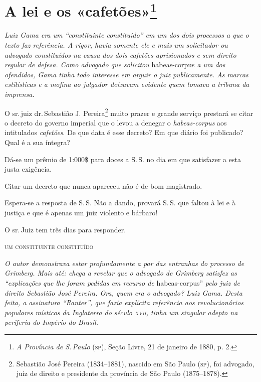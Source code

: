 \chapter{A lei e os «cafetões»\footnote{\emph{A Província de S.\,Paulo} (\textsc{sp}), Seção Livre, 21 de janeiro de 1880, p. 2.}}

\begin{resumo}
\emph{Luiz Gama era um ``constituinte constituído'' em um dos dois
processos a que o texto faz referência. A rigor, havia somente ele e
mais um solicitador ou advogado constituídos na causa dos dois cafetões
aprisionados e sem direito regular de defesa. Como advogado que
solicitou} habeas-corpus \emph{a um dos ofendidos, Gama tinha todo
interesse em arguir o juiz publicamente. As marcas estilísticas e a
mofina ao julgador deixavam evidente quem tomava a tribuna da imprensa.}
\end{resumo}

O sr.\,juiz dr.\,Sebastião J. Pereira\footnote{Sebastião José Pereira \label{sjp}
  (1834--1881), nascido em São Paulo (\textsc{sp}), foi advogado, juiz de direito
  e presidente da província de São Paulo (1875--1878).}
muito prazer e grande
serviço prestará se citar o decreto do governo imperial que o levou a
denegar o \emph{habeas-corpus} aos intitulados \emph{cafetões}. De que
data é esse decreto? Em que diário foi publicado? Qual é a sua íntegra?

Dá-se um prêmio de 1:000\$ para doces a S.\,S. no dia em que satisfazer a
esta justa exigência.

Citar um decreto que nunca apareceu não é de bom magistrado.

Espera-se a resposta de S.\,S. Não a dando, provará S.\,S. que faltou à
lei e à justiça e que é apenas um juiz violento e bárbaro!

O sr.\,Juiz tem três dias para responder.\medskip

\hfill\textsc{um constituinte constituído}


\begin{resumo}
\emph{O autor demonstrava estar profundamente a par das entranhas do
processo de Grimberg. Mais até: chega a revelar que o advogado de
Grimberg satisfez as ``explicações que lhe foram pedidas em recurso de}
habeas-corpus'' \emph{pelo juiz de direito Sebastião José Pereira. Ora,
quem era o advogado? Luiz Gama. Desta feita, a assinatura ``Ranter'', que
fazia explícita referência aos revolucionários populares místicos da
Inglaterra do século \textsc{xvii}, tinha um singular adepto na periferia do
Império do Brasil.}
\end{resumo}

